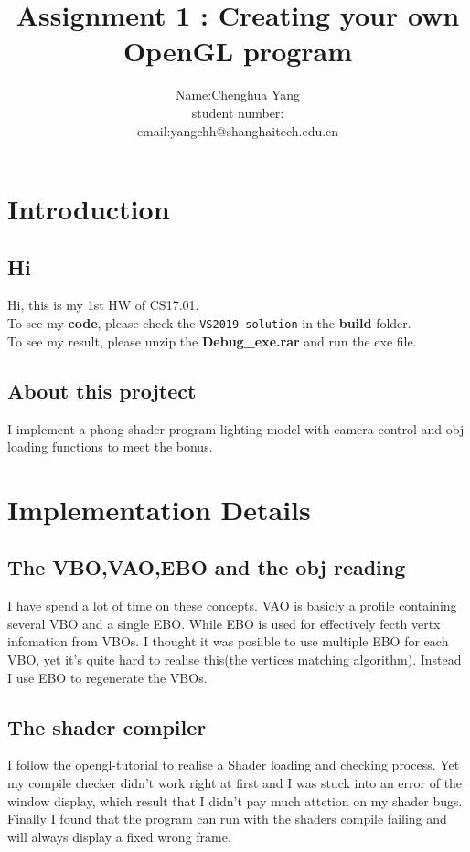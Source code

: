\documentclass[acmtog]{acmart}
\title{Assignment 1 : Creating your own OpenGL program}
\author{Name:\quad Chenghua Yang  \\ student number:\quad 2019533089
	\\email:\quad yangchh@shanghaitech.edu.cn}
\begin{document}
\maketitle

\vspace*{2 ex}


\section{Introduction}
\subsection{Hi}
    Hi, this is my 1st HW of CS17.01.\\
    To see my \textbf{code}, please check the \texttt{VS2019 solution} in the \textbf{build} folder.\\
    To see my result, please unzip the \textbf{Debug\_exe.rar} and run the exe file.
\subsection{About this projtect}
    I implement a phong shader program lighting model with camera control and obj loading functions to meet the bonus.
\section{Implementation Details}
    \subsection{The VBO,VAO,EBO and the obj reading}
    I have spend a lot of time on these concepts. VAO is basicly a profile containing several VBO and a single EBO. While EBO is used for effectively fecth vertx infomation from VBOs. I thought it was posiible to use multiple EBO for each VBO, yet it's quite hard to realise this(the vertices matching algorithm). Instead I use EBO to regenerate the VBOs.
    \subsection{The shader compiler}
    I follow the opengl-tutorial to realise a Shader loading and checking process. Yet my compile checker didn't work right at first and I was stuck into an error of the window display, which result that I didn't pay much attetion on my shader bugs. Finally I found that the program can run with the shaders compile failing and will always display a fixed wrong frame.
\end{document}
